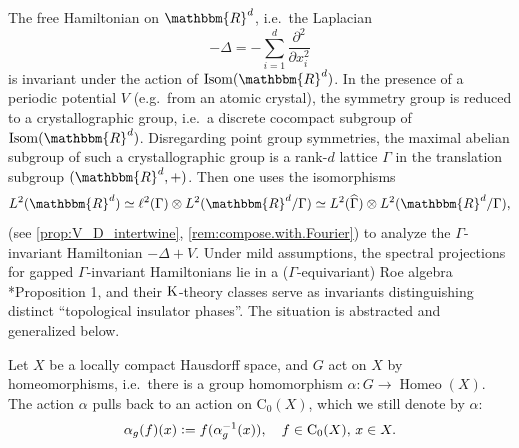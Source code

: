 \documentclass{amsart}
\numberwithin{figure}{section}
\numberwithin{equation}{section}
\numberwithin{table}{section}
\theoremstyle{plain}
\theoremstyle{definition}
\theoremstyle{remark}
\theoremstyle{nonumber}
\newcommand{\R}{\mathbb{R}}
\newcommand{\K}{\relax\ifmmode\operatorname{K}\else\textup{K}\fi}
\newcommand{\Co}{\mathrm{C}_0}
\newcommand{\Isom}{\mathrm{Isom}}
\newcommand{\defeq}{\mathrel{\vcentcolon=}}
\renewcommand{\mathbb}{\mathbbm} %
\begin{document}
The free Hamiltonian on \( \R^d \), i.e.~the Laplacian
\[
  -\Delta=-\sum_{i=1}^d\frac{\partial^2}{\partial x_i^2}
\]
is invariant under the action of \( \Isom(\R^d) \).
In the presence of a periodic potential {\( V \)} (e.g.~from an atomic crystal), the symmetry group is reduced to a crystallographic group,
i.e.~a discrete cocompact subgroup of $\Isom(\R^d)$.
Disregarding point group symmetries, the maximal abelian subgroup
of such a crystallographic group is a 
rank-$d$ lattice $\Gamma$ in the translation
subgroup $(\R^d,+)$.
Then one uses the isomorphisms
\[ 
  L^2(\R^d)\simeq \ell^2(\Gamma)\otimes L^2(\R^d/\Gamma)\simeq
  L^2(\widehat{\Gamma})\otimes L^2(\R^d/\Gamma), 
\] 
(see
\cref{prop:V_D_intertwine}, \cref{rem:compose.with.Fourier}) to analyze the $\Gamma$-invariant Hamiltonian \( -\Delta+V \).  Under mild assumptions, the
spectral projections for gapped $\Gamma$-invariant Hamiltonians lie in a
($\Gamma$-equivariant) Roe algebra
\cite{Ewert-Meyer:Coarse_geometry}*{Proposition 1}, and their $\K$-theory
classes serve as invariants distinguishing distinct ``topological insulator
phases''. The situation is abstracted and generalized below. 

\medskip

Let \( X \) be a locally compact Hausdorff space, and \( G \) act on \( X
\) by homeomorphisms, i.e.~there is a group homomorphism \( \alpha\colon
G\to\operatorname{Homeo}(X) \).
The action \( \alpha \) pulls back
to an action on \( \Co(X) \), which we still denote by \( \alpha \): 
\[ 
  \alpha_g(f)(x)\defeq f(\alpha^{-1}_g(x)),\quad f\in\Co(X),\,x\in X.
\]
\end{document}
